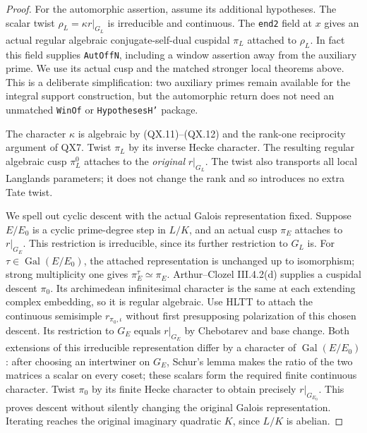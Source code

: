 \begin{proof}
For the automorphic assertion, assume its additional
hypotheses.  The scalar twist
$\rho_L=\kappa r|_{G_L}$ is irreducible and
continuous.  The \texttt{end2} field at $x$ gives
an actual regular algebraic conjugate-self-dual
cuspidal $\pi_L$ attached to $\rho_L$.
In fact this field supplies \texttt{AutOffN},
including a window assertion away from the auxiliary
prime.  We use its actual cusp and the matched
stronger local theorems above.  This is a deliberate
simplification: two auxiliary primes remain available
for the integral support construction, but the
automorphic return does not need an unmatched
\texttt{WinOf} or \texttt{HypothesesH'} package.

The character $\kappa$ is algebraic by (QX.11)--(QX.12)
and the rank-one reciprocity argument of QX7.
Twist $\pi_L$ by its inverse Hecke character.
The resulting regular algebraic cusp $\pi_L^0$
attaches to the \emph{original} $r|_{G_L}$.
The twist also transports all local Langlands
parameters; it does not change the rank and so
introduces no extra Tate twist.

We spell out cyclic descent with the actual Galois
representation fixed.  Suppose $E/E_0$ is a cyclic
prime-degree step in $L/K$, and an actual cusp
$\pi_E$ attaches to $r|_{G_E}$.  This restriction
is irreducible, since its further restriction to
$G_L$ is.  For $\tau\in\operatorname{Gal}(E/E_0)$,
the attached representation is unchanged up to
isomorphism; strong multiplicity one gives
$\pi_E^\tau\simeq\pi_E$.
Arthur--Clozel III.4.2(d) supplies a cuspidal descent
$\pi_0$.  Its archimedean infinitesimal character
is the same at each extending complex embedding,
so it is regular algebraic.
Use HLTT to attach the continuous semisimple
$r_{\pi_0,\iota}$ without first presupposing
polarization of this chosen descent.
Its restriction to $G_E$ equals $r|_{G_E}$ by
Chebotarev and base change.  Both extensions of
this irreducible representation differ by a
character of $\operatorname{Gal}(E/E_0)$:
after choosing an intertwiner on $G_E$, Schur's
lemma makes the ratio of the two matrices a scalar
on every coset; these scalars form the required
finite continuous character.  Twist $\pi_0$ by
its finite Hecke character to obtain precisely
$r|_{G_{E_0}}$.  This proves descent without
silently changing the original Galois representation.
Iterating reaches the original imaginary quadratic
$K$, since $L/K$ is abelian.


\end{proof}
